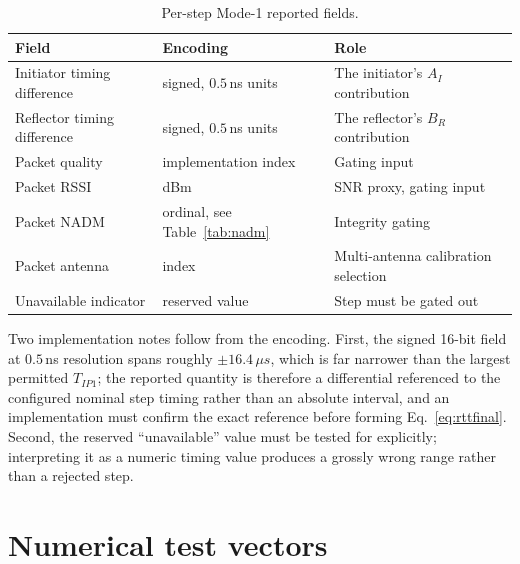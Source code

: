 \documentclass[11pt,a4paper]{article}
\newcommand{\us}{\,\ensuremath{\upmu}s}
\newcommand{\NADM}{\mathrm{NADM}}
\newcommand{\Tip}{T_{IP1}}
\providecommand{\upmu}{\mu}
\begin{document}
\begin{table}[h]
\caption{Per-step Mode-1 reported fields.}
\label{tab:hci}
\centering\small
\begin{tabular}{@{}L{40mm}L{34mm}L{50mm}@{}}
\toprule
Field & Encoding & Role \\
\midrule
Initiator timing difference & signed, $0.5$\,ns units & The initiator's $A_I$ contribution \\
Reflector timing difference & signed, $0.5$\,ns units & The reflector's $B_R$ contribution \\
Packet quality & implementation index & Gating input \\
Packet RSSI & dBm & SNR proxy, gating input \\
Packet $\NADM$ & ordinal, see Table~\ref{tab:nadm} & Integrity gating \\
Packet antenna & index & Multi-antenna calibration selection \\
Unavailable indicator & reserved value & Step must be gated out \\
\bottomrule
\end{tabular}
\end{table}

Two implementation notes follow from the encoding. First, the signed 16-bit field at $0.5$\,ns
resolution spans roughly $\pm 16.4\us$, which is far narrower than the largest permitted $\Tip$;
the reported quantity is therefore a differential referenced to the configured nominal step timing
rather than an absolute interval, and an implementation must confirm the exact reference before
forming Eq.~\eqref{eq:rttfinal}. Second, the reserved ``unavailable'' value must be tested for
explicitly; interpreting it as a numeric timing value produces a grossly wrong range rather than a
rejected step.

\section{Numerical test vectors}
\end{document}
